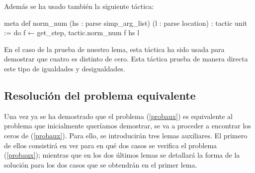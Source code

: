 Además se ha usado también la siguiente táctica:
\begin{leancode}
meta def norm_num (hs : parse simp_arg_list) (l : parse location) :
tactic unit :=
do f ← get_step, tactic.norm_num f hs l
\end{leancode}

En el caso de la prueba de nuestro lema, esta táctica ha sido
usada para demostrar que cuatro es distinto de cero. Esta táctica
prueba de manera directa este tipo de igualdades y desigualdades.

\subsection{Resolución del problema equivalente}\label{secequiv}
Una vez ya se ha demostrado que el problema (\ref{probaux}) es
equivalente al problema que inicialmente queríamos demostrar, se
va a proceder a encontrar los ceros de (\ref{probaux}). Para
ello, se introducirán tres lemas auxiliares. El primero de ellos
consistirá en ver para en qué dos casos se verifica el problema
(\ref{probaux}); mientras que en los dos últimos lemas se detallará
la forma de la solución para los dos casos que se obtendrán en el
primer lema.

